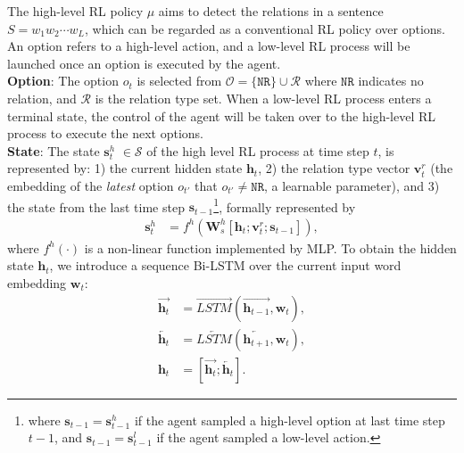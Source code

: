 \documentclass[letterpaper]{article} %
\theoremstyle{definition}
\begin{document}
The high-level RL policy $\mu$ aims to detect the relations in a sentence $S = w_1 w_2 \cdots w_L$, which can be regarded as a conventional RL policy over options. An option refers to a high-level action, and a low-level RL process will be launched once an option is executed by the agent. 
\\
\textbf{Option}: The option $o_t$ is selected from $\mathcal{O} = \{ \texttt{NR} \} \cup \mathcal{R}$ where $\texttt{NR}$ indicates no relation, and $\mathcal{R}$ is the relation type set. When a low-level RL process enters a terminal state, the control of the agent will be taken over to the high-level RL process to execute the next options. 
\\
\textbf{State}: The state $\mathbf{s}_t^h$ $\in \mathcal{S}$ of the high level RL process at time step $t$, is represented by: 1) the current hidden state $\mathbf{h}_t$, 2) the relation type vector $\mathbf{v}_t^r$ (the embedding of the \textit{latest} option $o_{t'}$ that $o_{t'} \not= \texttt{NR}$, a learnable parameter), and 3) the state from the last time step $\mathbf{s}_{t-1}$\footnote{where $\mathbf{s}_{t-1} = \mathbf{s}_{t-1}^h$ if the agent sampled a high-level option at last time step $t-1$, and $\mathbf{s}_{t-1} = \mathbf{s}_{t-1}^l$ if the agent sampled a low-level action.}, formally represented by 
\begin{equation}\label{state_high}
    \begin{split}
        \mathbf{s}_t^h &= f^h(\mathbf{W}_s^h [ \mathbf{h}_t ; \mathbf{v}_t^r ; \mathbf{s}_{t-1}]),
    \end{split}
\end{equation}
where $f^h(\cdot)$ is a non-linear function implemented by MLP. To obtain the hidden state $\mathbf{h}_t$, we introduce a sequence Bi-LSTM over the current input word embedding $\mathbf{w}_t$:
%
\begin{equation}\label{LSTM}
    \begin{split}
        \overrightarrow{\mathbf{h}_t} &= \overrightarrow{LSTM}(\overrightarrow{\mathbf{h}_{t-1}}, \mathbf{w}_t), \\
        \overleftarrow{\mathbf{h}_t} &= \overleftarrow{LSTM}(\overleftarrow{\mathbf{h}_{t+1}}, \mathbf{w}_t), \\
        \mathbf{h}_t &= [ \overrightarrow{\mathbf{h}_t} ; \overleftarrow{\mathbf{h}_t} ].
    \end{split}
\end{equation}
\end{document}
